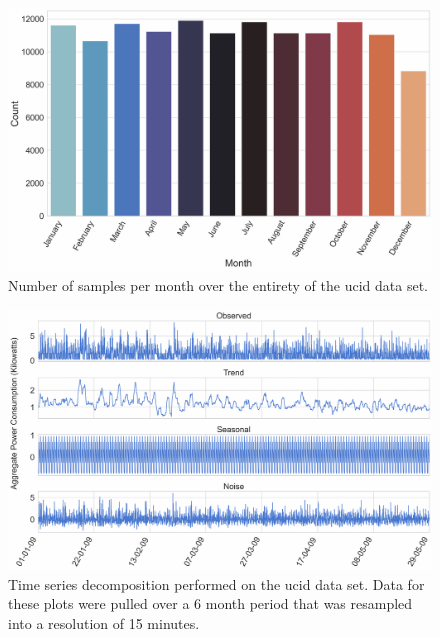 \begin{figure}[hbt!]
    \centering
    \includegraphics[width=\textwidth]{Images/Chapter 4/UCID/UCID-Month-Count.pdf}
    \caption{Number of samples per month over the entirety of the \gls{ucid} data set.}
    \label{fig:UCID-Month-Count}
\end{figure}

\begin{figure}[hbt!]
    \centering
    \includegraphics[width=\textwidth]{Images/Chapter 4/UCID/UCID-Time-Series-Decomposition-NoSmoothing.pdf}
    \caption{Time series decomposition performed on the \gls{ucid} data set. Data for these plots were pulled over a 6 month period that was resampled into a resolution of 15 minutes.}
    \label{fig:UCID-Time-Series-Decomposition}
\end{figure}

